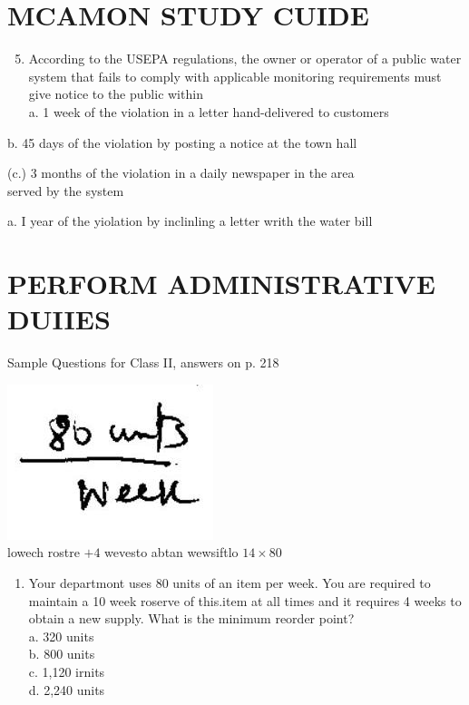 \documentclass[10pt]{article}
\begin{document}
\section{MCAMON STUDY CUIDE}
\begin{enumerate}
  \setcounter{enumi}{4}
  \item According to the USEPA regulations, the owner or operator of a public water system that fails to comply with applicable monitoring requirements must give notice to the public within\\
a. 1 week of the violation in a letter hand-delivered to customers
\end{enumerate}

b. 45 days of the violation by posting a notice at the town hall

(c.) 3 months of the violation in a daily newspaper in the area\\
served by the system

a. I year of the yiolation by inclinling a letter writh the water bill

\section{PERFORM ADMINISTRATIVE DUIIES}
Sample Questions for Class II, answers on p. 218

\includegraphics[max width=\textwidth]{2022_11_11_ca6a6c1a0324ee23e523g-43}\\
lowech rostre $+4$ wevesto abtan wewsiftlo $14 \times 80$

\begin{enumerate}
  \item Your departmont uses 80 units of an item per week. You are required to maintain a 10 week roserve of this.item at all times and it requires 4 weeks to obtain a new supply. What is the minimum reorder point?\\
a. 320 units\\
b. 800 units\\
c. 1,120 irnits\\
d. 2,240 units
\end{enumerate}
\end{document}
